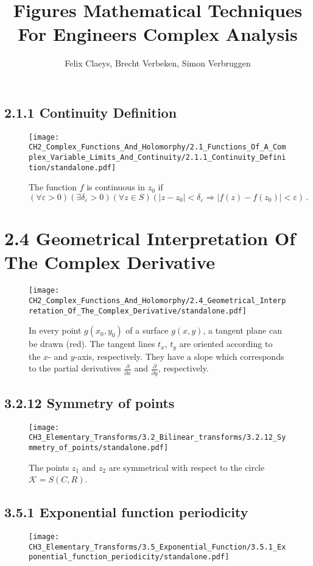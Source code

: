 \documentclass{book}
\title{Figures Mathematical Techniques For Engineers Complex Analysis}
\author{Felix Claeys, Brecht Verbeken, Simon Verbruggen}
\begin{document}
\maketitle
\subsection*{2.1.1 Continuity Definition}
\begin{figure}[H]
\centering
\texttt{[image: CH2\_Complex\_Functions\_And\_Holomorphy/2.1\_Functions\_Of\_A\_Complex\_Variable\_Limits\_And\_Continuity/2.1.1\_Continuity\_Definition/standalone.pdf]}
\caption{The function $f$ is continuous in $z_0$ if $( \forall \varepsilon > 0)(\exists \delta_\varepsilon > 0)(\forall z \in S)(|z-z_0|<\delta_\varepsilon \Longrightarrow |f(z) - f(z_0)|<\varepsilon)\, . $}
\end{figure}

\section*{2.4 Geometrical Interpretation Of The Complex Derivative}
\begin{figure}[H]
\centering
\texttt{[image: CH2\_Complex\_Functions\_And\_Holomorphy/2.4\_Geometrical\_Interpretation\_Of\_The\_Complex\_Derivative/standalone.pdf]}
\caption{In every point  $g(x_0, y_0)$ of a surface $g(x,y)$, a tangent plane can be drawn (red). The tangent lines $t_x$, $t_y$ are oriented according to the $x$- and $y$-axis, respectively. They have a slope which corresponds to the partial derivatives $\frac{\partial}{\partial x}$ and $\frac{\partial}{\partial y}$, respectively.}
\end{figure}

\subsection*{3.2.12 Symmetry of points}
\begin{figure}[H]
\centering
\texttt{[image: CH3\_Elementary\_Transforms/3.2\_Bilinear\_transforms/3.2.12\_Symmetry\_of\_points/standalone.pdf]}
\caption{The points $z_1$ and $z_2$ are symmetrical with respect to the circle $\mathcal{K} = S(C,R)$.}
\end{figure}

\subsection*{3.5.1 Exponential function periodicity}
\begin{figure}[H]
\centering
\texttt{[image: CH3\_Elementary\_Transforms/3.5\_Exponential\_Function/3.5.1\_Exponential\_function\_periodicity/standalone.pdf]}
\caption{}
\end{figure}
\end{document}
